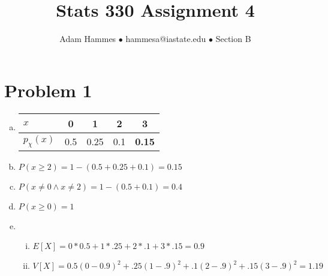 \documentclass[11pt]{article}
\begin{document}
\title{Stats 330 Assignment 4}
\author{Adam Hammes $\bullet$ hammesa@iastate.edu $\bullet$ Section B}
\maketitle

\section*{Problem 1}
\begin{enumerate}[(a)]
	\item
	\begin{tabular}{l| c c c c|}
		$x$ & 0 & 1 & 2 & 3 \\
		\hline
		$p_{\chi}(x)$ & 0.5 & 0.25 & 0.1 & \textbf{0.15}\\
	\end{tabular}

	\item $P ( x \ge 2) = 1 - (0.5 + 0.25 + 0.1 ) = 0.15$
	
	\item $P ( x \neq 0 \wedge x \neq 2 ) = 1 - (0.5 + 0.1 ) = 0.4$
	
	\item $P ( x \ge 0 ) = 1$
	
	\item
	\begin{enumerate}[i.]
		\item $E[X] = 0 * 0.5 + 1 * .25 + 2 * .1 + 3 * .15 = 0.9$
		
		\item $V[X] = 0.5(0 - 0.9)^2 + .25(1-.9)^2+ .1(2-.9)^2  + .15(3-.9)^2 = 1.19$
	\end{enumerate}
\end{enumerate}
\end{document}
